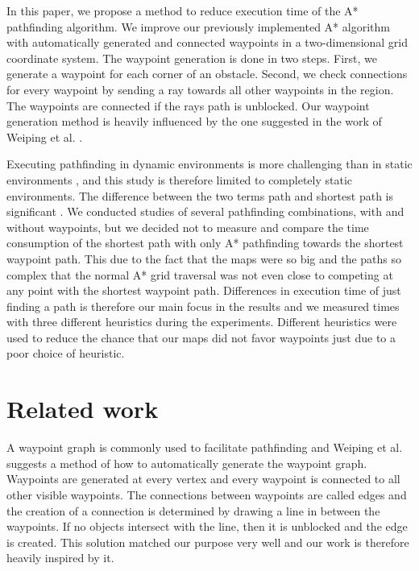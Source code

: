 \documentclass[a4paper]{article}
\begin{document}
{In this paper, we propose a method to reduce execution time of the A* pathfinding algorithm. We improve our previously implemented A* algorithm with automatically generated and connected waypoints in a two-dimensional grid coordinate system. The waypoint generation is done in two steps. First, we generate a waypoint for each corner of an obstacle. Second, we check connections for every waypoint by sending a ray towards all other waypoints in the region. The waypoints are connected if the rays path is unblocked. Our waypoint generation method is heavily influenced by the one suggested in the work of Weiping et al. \cite{dynaPF15}.
	
Executing pathfinding in dynamic environments is more challenging than in static environments \cite{dynaPF15}, and this study is therefore limited to completely static environments. The difference between the two terms path and shortest path is significant \cite{heuristicGame15}. We conducted studies of several pathfinding combinations, with and without waypoints, but we decided not to measure and compare the time consumption of the shortest path with only A* pathfinding towards the shortest waypoint path. This due to the fact that the maps were so big and the paths so complex that the normal A* grid traversal was not even close to competing at any point with the shortest waypoint path. Differences in execution time of just finding a path is therefore our main focus in the results and we measured times with three different heuristics during the experiments. Different heuristics were used to reduce the chance that our maps did not favor waypoints just due to a poor choice of heuristic.

\section{Related work}
A waypoint graph is commonly used to facilitate pathfinding and Weiping et al. \cite{dynaPF15} suggests a method of how to automatically generate the waypoint graph. Waypoints are generated at every vertex and every waypoint is connected to all other visible waypoints. The connections between waypoints are called edges \cite{dynaPF15} and the creation of a connection is determined by drawing a line in between the waypoints. If no objects intersect with the line, then it is unblocked and the edge is created. This solution matched our purpose very well and our work is therefore heavily inspired by it.

}
\end{document}
